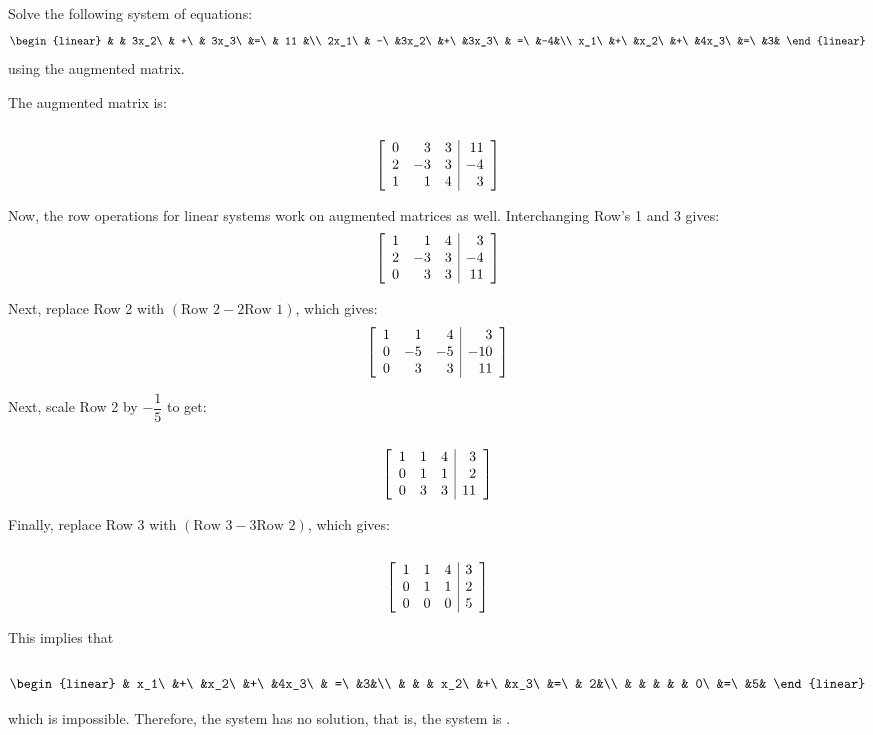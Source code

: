 \begin{Exam} %
Solve the following system of equations:
\[\begin{linear}
& &  3x_2\ & +\ & 3x_3\ &=\ & 11 &\\ 
2x_1\ & -\ &3x_2\ &+\ &3x_3\ & =\ &-4&\\ 
x_1\ &+\ &x_2\ &+\ &4x_3\ &=\ &3&
\end{linear}\] using the augmented matrix.

\begin{multicols}{2}
The augmented matrix is:\\\\
\[\mtx{rrr|r}{ 0&3&3&11\\2&-3&3&-4\\1&1&4&3}\]
\end{multicols}

\begin{multicols}{2}
\noindent Now, the row operations for linear systems work on augmented matrices as well. Interchanging Row's 1 and 3 gives:\\
\[\mtx{rrr|r}{ 1&1&4&3\\2&-3&3&-4\\0&3&3&11}\]
\end{multicols}

\begin{multicols}{2}
\noindent Next, replace Row 2 with $(\text{Row 2} - 2\text{Row 1})$, which gives:\\
\[\mtx{rrr|r}{ 1&1&4&3\\0&-5&-5&-10\\0&3&3&11}\]
\end{multicols}

\begin{multicols}{2}
\noindent Next, scale Row 2 by $-\dfrac{1}{5}$ to get:\\\\
\[\mtx{rrr|r}{ 1&1&4&3\\0&1&1&2\\0&3&3&11}\]
\end{multicols}

\begin{multicols}{2}
\noindent Finally, replace Row 3 with $(\text{Row 3} - 3\text{Row 2})$, which gives:\\\\
\[\mtx{rrr|r}{ 1&1&4&3\\0&1&1&2\\0&0&0&5}\]
\end{multicols}

\begin{multicols}{2}
 \noindent This implies that \\\\
\[\begin{linear}
& x_1\ &+\ &x_2\ &+\ &4x_3\ & =\ &3&\\ 
& & & x_2\ &+\ &x_3\ &=\ & 2&\\  
& & & & & 0\ &=\ &5&
\end{linear}\]
\end{multicols}
\noindent which is impossible. Therefore, the system has no solution, that is, the system is .
\end{Exam}\vs

